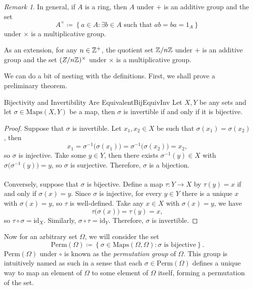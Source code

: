\documentclass[math, code]{amznotes}
\theoremstyle{remark}
\newtheorem*{remark}{Remark}
\begin{document}
\begin{notebox}
    \begin{remark}
        In general, if $A$ is a ring, then $A$ under $+$ is an additive group and the set
        \begin{equation*}
            A^{\times} \coloneqq \left\{a \in A \colon \exists b \in A \textrm{ such that } ab = ba = 1_A\right\}
        \end{equation*}
        under $\times$ is a multiplicative group. 
    \end{remark}
\end{notebox}
As an extension, for any $n \in \mathbb{Z}^+$, the quotient set $\mathbb{Z}/n\mathbb{Z}$ under $+$ is an additive group and the set $(Z/n\mathbb{Z})^{\times}$ under $\times$ is a multiplicative group.

We can do a bit of nesting with the definitions. First, we shall prove a preliminary theorem.
\begin{thmbox}{Bijectivity and Invertibility Are Equivalent}{BijEquivInv}
    Let $X, Y$ be any sets and let $\sigma \in \mathrm{Maps}(X, Y)$ be a map, then $\sigma$ is invertible if and only if it is bijective.
    \tcblower
    \begin{proof}
        Suppose that $\sigma$ is invertible. Let $x_1, x_2 \in X$ be such that $\sigma(x_1) = \sigma(x_2)$, then 
        \begin{equation*}
            x_1 = \sigma^{-1}\bigl(\sigma(x_1)\bigr) = \sigma^{-1}\bigl(\sigma(x_2)\bigr) = x_2,
        \end{equation*}
        so $\sigma$ is injective. Take some $y \in Y$, then there exists $\sigma^{-1}(y) \in X$ with $\sigma\bigl(\sigma^{-1}(y)\bigr) = y$, so $\sigma$ is surjective. Therefore, $\sigma$ is a bijection.
        \\\\
        Conversely, suppose that $\sigma$ is bijective. Define a map $\tau \colon Y \to X$ by $\tau(y) = x$ if and only if $\sigma(x) = y$. Since $\sigma$ is injective, for every $y \in Y$ there is a unique $x$ with $\sigma(x) = y$, so $\tau$ is well-defined. Take any $x \in X$ with $\sigma(x) = y$, we have
        \begin{equation*}
            \tau\bigl(\sigma(x)\bigr) = \tau(y) = x,
        \end{equation*}
        so $\tau \circ \sigma = \mathrm{id}_X$. Similarly, $\sigma \circ \tau = \mathrm{id}_Y$. Therefore, $\sigma$ is invertible.
    \end{proof}
\end{thmbox}
Now for an arbitrary set $\Omega$, we will consider the set 
\begin{equation*}
    \mathrm{Perm}(\Omega) \coloneqq \left\{\sigma \in \mathrm{Maps}(\Omega, \Omega) \colon \sigma \textrm{ is bijective}\right\}.
\end{equation*}
$\mathrm{Perm}(\Omega)$ under $\circ$ is known as the \textit{permutation group} of $\Omega$. This group is intuitively named as such in a sense that each $\sigma \in \mathrm{Perm}(\Omega)$ defines a unique way to map an element of $\Omega$ to some element of $\Omega$ itself, forming a permutation of the set. 
\end{document}
